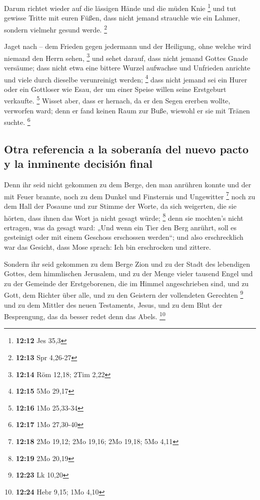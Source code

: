  Darum richtet wieder auf die lässigen Hände und die
müden Knie \footnote{\textbf{12:12} Jes 35,3}  und tut
gewisse Tritte mit euren Füßen, dass nicht jemand strauchle wie ein
Lahmer, sondern vielmehr gesund werde. \footnote{\textbf{12:13} Spr
  4,26-27}

 Jaget nach -- dem Frieden gegen jedermann und der
Heiligung, ohne welche wird niemand den Herrn sehen, \footnote{\textbf{12:14}
  Röm 12,18; 2Tim 2,22}  und sehet darauf, dass nicht
jemand Gottes Gnade versäume; dass nicht etwa eine bittere Wurzel
aufwachse und Unfrieden anrichte und viele durch dieselbe verunreinigt
werden; \footnote{\textbf{12:15} 5Mo 29,17}  dass nicht
jemand sei ein Hurer oder ein Gottloser wie Esau, der um einer Speise
willen seine Erstgeburt verkaufte. \footnote{\textbf{12:16} 1Mo 25,33-34}
 Wisset aber, dass er hernach, da er den Segen ererben
wollte, verworfen ward; denn er fand keinen Raum zur Buße, wiewohl er
sie mit Tränen suchte. \footnote{\textbf{12:17} 1Mo 27,30-40}

\hypertarget{otra-referencia-a-la-soberanuxeda-del-nuevo-pacto-y-la-inminente-decisiuxf3n-final}{%
\subsection{Otra referencia a la soberanía del nuevo pacto y la
inminente decisión
final}\label{otra-referencia-a-la-soberanuxeda-del-nuevo-pacto-y-la-inminente-decisiuxf3n-final}}

 Denn ihr seid nicht gekommen zu dem Berge, den man
anrühren konnte und der mit Feuer brannte, noch zu dem Dunkel und
Finsternis und Ungewitter \footnote{\textbf{12:18} 2Mo 19,12; 2Mo 19,16;
  2Mo 19,18; 5Mo 4,11}  noch zu dem Hall der Posaune und
zur Stimme der Worte, da sich weigerten, die sie hörten, dass ihnen das
Wort ja nicht gesagt würde; \footnote{\textbf{12:19} 2Mo 20,19}
 denn sie mochten's nicht ertragen, was da gesagt ward:
„Und wenn ein Tier den Berg anrührt, soll es gesteinigt oder mit einem
Geschoss erschossen werden``;  und also erschrecklich war
das Gesicht, dass Mose sprach: Ich bin erschrocken und zittere.

 Sondern ihr seid gekommen zu dem Berge Zion und zu der
Stadt des lebendigen Gottes, dem himmlischen Jerusalem, und zu der Menge
vieler tausend Engel  und zu der Gemeinde der
Erstgeborenen, die im Himmel angeschrieben sind, und zu Gott, dem
Richter über alle, und zu den Geistern der vollendeten Gerechten
\footnote{\textbf{12:23} Lk 10,20}  und zu dem Mittler
des neuen Testaments, Jesus, und zu dem Blut der Besprengung, das da
besser redet denn das Abels. \footnote{\textbf{12:24} Hebr 9,15; 1Mo
  4,10}

